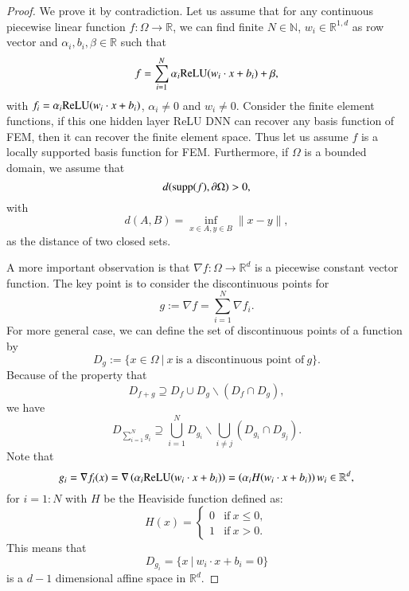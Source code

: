 \begin{proof}
	We prove it by contradiction. Let us assume that for any continuous
	piecewise linear function $f: \Omega \to \mathbb{R} $, we can find
	finite $N \in \mathbb{N}$, $w_i \in \mathbb{R}^{1,d}$ as row vector
	and $\alpha_i, b_i, \beta \in \mathbb{R}$ such that
	$$
	f =  \sum_{i=1}^N \alpha_i {\rm ReLU}(w_i\cdot  x +b_i) + \beta,
	$$
	with $f_i = \alpha_i {\rm ReLU}(w_i\cdot  x +b_i)$, $\alpha_i \neq 0$ and $w_i
	\neq 0$.  Consider the finite element functions, if this one hidden
	layer ReLU DNN can recover any basis function of FEM, then it can
	recover the finite element space.  Thus let us assume $f$ is a locally
	supported basis function for FEM.
	Furthermore, if $\Omega$ is a bounded domain, we assume that 
	\begin{equation}\label{distcondi}
	d({\rm supp}(f), \partial \Omega) > 0,
	\end{equation}with 
	$$
	d(A, B) = \inf_{x\in A, y\in B} \|x-y\|,
	$$ 
	as the distance of two closed sets. 
	
	A more important observation is that $\nabla f: \Omega \to
	\mathbb{R}^d$ is a piecewise constant vector function. The key
	point is to consider the discontinuous points for 
	$$g := \nabla
	f = \sum_{i=1}^N \nabla f_i.$$
	For more general case, we can define the set of discontinuous points of a function by
	$$
	D_{g} := \{x \in \Omega~|~ x ~ \text{is a discontinuous point of} ~ g\}.
	$$
	Because of the property that 
	\begin{equation}\label{eq:disfun}
	D_{f+g} \supseteq D_{f} \cup D_{g} \backslash (D_{f} \cap D_{g}),
	\end{equation}
	we have
	\begin{equation}\label{eq:dis_fn}
	D_{\sum_{i=1}^N g_i} \supseteq \bigcup_{i=1}^N D_{g_i} \backslash \bigcup_{i\neq j}\left( D_{g_i}\cap D_{g_j} \right).
	\end{equation}
	Note that
	\begin{equation}\label{eq:def_gi}
	g_i = \nabla f_i(x) =  \nabla \left( \alpha_i {\rm ReLU}(w_i\cdot   x +b_i)  \right) =\left(\alpha_iH(w_i \cdot  x +b_i)\right)w_i \in \mathbb{R}^d,
	\end{equation}
	for $i=1:N$ with $H$ be the Heaviside function defined as: 
	$$
	H(x) = \begin{cases}
	0 &\text{if} ~ x \le 0, \\
	1 &\text{if} ~ x > 0.
	\end{cases}
	$$ 
	This means that 
	\begin{equation}\label{eq: D_gi}
	D_{g_i} = \{ x ~|~ w_i\cdot   x + b_i = 0\}
	\end{equation}
	is a $d-1$ dimensional affine space in $\mathbb{R}^d$.  
	

\end{proof}
